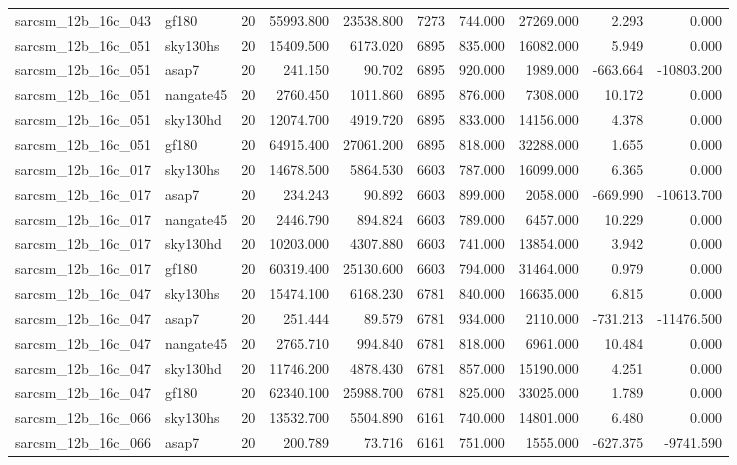 \begin{longtable}{llrrrrrrrr}
sarcsm\_12b\_16c\_043 & gf180 & 20 & 55993.800 & 23538.800 & 7273 & 744.000 & 27269.000 & 2.293 & 0.000 \\
sarcsm\_12b\_16c\_051 & sky130hs & 20 & 15409.500 & 6173.020 & 6895 & 835.000 & 16082.000 & 5.949 & 0.000 \\
sarcsm\_12b\_16c\_051 & asap7 & 20 & 241.150 & 90.702 & 6895 & 920.000 & 1989.000 & -663.664 & -10803.200 \\
sarcsm\_12b\_16c\_051 & nangate45 & 20 & 2760.450 & 1011.860 & 6895 & 876.000 & 7308.000 & 10.172 & 0.000 \\
sarcsm\_12b\_16c\_051 & sky130hd & 20 & 12074.700 & 4919.720 & 6895 & 833.000 & 14156.000 & 4.378 & 0.000 \\
sarcsm\_12b\_16c\_051 & gf180 & 20 & 64915.400 & 27061.200 & 6895 & 818.000 & 32288.000 & 1.655 & 0.000 \\
sarcsm\_12b\_16c\_017 & sky130hs & 20 & 14678.500 & 5864.530 & 6603 & 787.000 & 16099.000 & 6.365 & 0.000 \\
sarcsm\_12b\_16c\_017 & asap7 & 20 & 234.243 & 90.892 & 6603 & 899.000 & 2058.000 & -669.990 & -10613.700 \\
sarcsm\_12b\_16c\_017 & nangate45 & 20 & 2446.790 & 894.824 & 6603 & 789.000 & 6457.000 & 10.229 & 0.000 \\
sarcsm\_12b\_16c\_017 & sky130hd & 20 & 10203.000 & 4307.880 & 6603 & 741.000 & 13854.000 & 3.942 & 0.000 \\
sarcsm\_12b\_16c\_017 & gf180 & 20 & 60319.400 & 25130.600 & 6603 & 794.000 & 31464.000 & 0.979 & 0.000 \\
sarcsm\_12b\_16c\_047 & sky130hs & 20 & 15474.100 & 6168.230 & 6781 & 840.000 & 16635.000 & 6.815 & 0.000 \\
sarcsm\_12b\_16c\_047 & asap7 & 20 & 251.444 & 89.579 & 6781 & 934.000 & 2110.000 & -731.213 & -11476.500 \\
sarcsm\_12b\_16c\_047 & nangate45 & 20 & 2765.710 & 994.840 & 6781 & 818.000 & 6961.000 & 10.484 & 0.000 \\
sarcsm\_12b\_16c\_047 & sky130hd & 20 & 11746.200 & 4878.430 & 6781 & 857.000 & 15190.000 & 4.251 & 0.000 \\
sarcsm\_12b\_16c\_047 & gf180 & 20 & 62340.100 & 25988.700 & 6781 & 825.000 & 33025.000 & 1.789 & 0.000 \\
sarcsm\_12b\_16c\_066 & sky130hs & 20 & 13532.700 & 5504.890 & 6161 & 740.000 & 14801.000 & 6.480 & 0.000 \\
sarcsm\_12b\_16c\_066 & asap7 & 20 & 200.789 & 73.716 & 6161 & 751.000 & 1555.000 & -627.375 & -9741.590 \\

\end{longtable}
